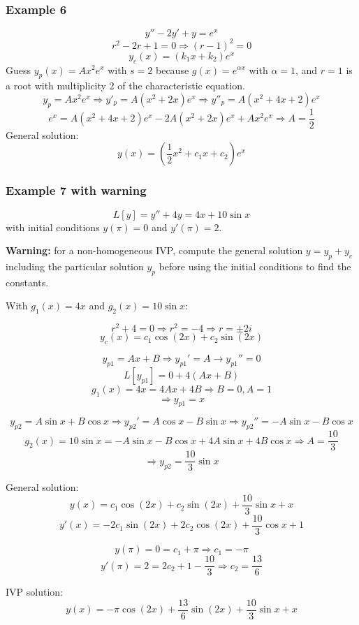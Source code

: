 \documentclass[11pt]{article}
\begin{document}
\subsubsection{Example 6}
		$$ y'' -2y' + y = e^x $$
		$$ r^2 - 2r + 1 = 0 \Rightarrow (r-1)^2 = 0 $$
		$$ y_c (x) = (k_1 x + k_2) e^x $$
	Guess $y_p(x) = Ax^2e^x$ with $s=2$ because $g(x) = e^{\alpha x}$ with $\alpha = 1$, and $r=1$ is a root with multiplicity 2 of the characteristic equation.
		$$ y_p = Ax^2e^x \Rightarrow y'_p = A(x^2 + 2x)e^x \Rightarrow y''_p = A(x^2 + 4x + 2)e^x $$
		$$ e^x = A(x^2 + 4x + 2)e^x - 2A(x^2 + 2x)e^x + Ax^2e^x \Rightarrow A = \frac{1}{2} $$
	General solution:
		$$ y(x) = \left(\frac{1}{2} x^2 + c_1 x + c_2\right) e^x $$

\subsubsection{Example 7 with warning}
		$$ L[y] = y'' + 4y  = 4x + 10\sin x $$
	with initial conditions $y(\pi) = 0$ and $y'(\pi) = 2$.

	\textbf{Warning:} for a non-homogeneous IVP, compute the general solution $y = y_p + y_c$ including the particular solution $y_p$ before using the initial conditions to find the constants.

	With $g_1(x) = 4x$ and $g_2(x) = 10 \sin x$:

		$$ r^2 + 4 = 0 \Rightarrow r^2 = -4 \Rightarrow r = \pm 2i $$
		$$ y_c (x) = c_1 \cos (2x) + c_2 \sin (2x) $$

		$$ y_{p1} = Ax+B \Rightarrow y_{p1}' = A \rightarrow y_{p1}'' = 0 $$
		$$ L[y_{p1}] = 0 + 4(Ax + B) $$
		$$ g_1 (x) = 4x = 4Ax+4B \Rightarrow B=0,A=1 $$
		$$ \Rightarrow y_{p1} = x $$

		$$ y_{p2} = A \sin x + B \cos x \Rightarrow y_{p2}' = A\cos x - B \sin x \Rightarrow y_{p2}'' = -A \sin x - B \cos x $$
		$$ g_2 (x) = 10 \sin x = -A \sin x - B \cos x + 4A \sin x + 4B \cos x \Rightarrow A = \frac{10}{3} $$
		$$ \Rightarrow y_{p2} = \frac{10}{3} \sin x $$

	General solution:
		$$ y(x) = c_1 \cos (2x) + c_2 \sin (2x) + \frac{10}{3} \sin x + x $$
		$$ y'(x) = -2 c_1 \sin (2x) + 2 c_2 \cos (2x) + \frac{10}{3} \cos x + 1 $$

		$$ y(\pi) = 0 = c_1 + \pi \Rightarrow c_1 = -\pi $$
		$$ y'(\pi) = 2 = 2c_2 + 1 - \frac{10}{3} \Rightarrow c_2 = \frac{13}{6} $$

	IVP solution:
		$$ y(x) = - \pi \cos (2x) + \frac{13}{6} \sin (2x) + \frac{10}{3} \sin x + x $$
\end{document}

